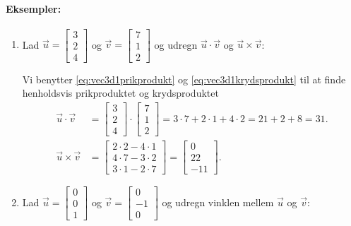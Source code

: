 \paragraph*{Eksempler:}
\begin{enumerate}
\item Lad $\vec{u}= \begin{bmatrix} 3 \\ 2 \\ 4\end{bmatrix}$ og $\vec{v}= \begin{bmatrix} 7 \\ 1 \\ 2 \end{bmatrix}$ og udregn $\vec{u}\cdot \vec{v}$ og $\vec{u} \times \vec{v}$:

Vi benytter \eqref{eq:vec3d1prikprodukt} og \eqref{eq:vec3d1krydsprodukt} til at finde henholdsvis prikproduktet og krydsproduktet
\begin{align*}
\vec{u}\cdot \vec{v} &=\begin{bmatrix} 3 \\ 2 \\ 4 \end{bmatrix}\cdot  \begin{bmatrix} 7 \\ 1 \\ 2 \end{bmatrix} = 3 \cdot 7 + 2 \cdot 1 + 4 \cdot 2 = 21+2 + 8 = 31.\\
\vec{u} \times \vec{v}&=\begin{bmatrix}
2 \cdot 2 - 4 \cdot 1 \\
4 \cdot 7 - 3 \cdot 2 \\
3 \cdot 1 - 2 \cdot 7
\end{bmatrix}
=\begin{bmatrix}
0 \\
22 \\
-11
\end{bmatrix}.
\end{align*}
\item Lad $\vec{u}= \begin{bmatrix} 0 \\ 0 \\ 1 \end{bmatrix}$ og $\vec{v}= \begin{bmatrix} 0 \\ -1 \\ 0 \end{bmatrix}$ og udregn vinklen mellem $\vec{u}$ og $\vec{v}$:


\end{enumerate}
